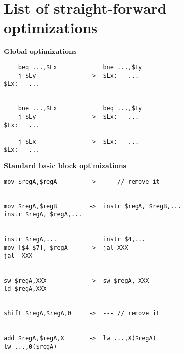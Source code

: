 \documentclass[10pt,a4paper]{article}
\begin{document}
\pagebreak
\appendix

\section{List of straight-forward optimizations}

\label{opt}

\textbf{Global optimizations}

\begin{verbatim}
    beq ...,$Lx             bne ...,$Ly
    j $Ly               ->  $Lx:   ...
$Lx:   ...


    bne ...,$Lx             beq ...,$Ly
    j $Ly               ->  $Lx:   ...
$Lx:   ...

    j $Lx               ->  $Lx:   ...
$Lx:   ...
\end{verbatim}
\textbf{Standard basic block optimizations}

\begin{verbatim}
mov $regA,$regA         ->  --- // remove it


mov $regA,$regB         ->  instr $regA, $regB,...
instr $regA, $regA,...


instr $regA,...             instr $4,...
mov [$4-$7], $regA      ->  jal XXX
jal  XXX


sw $regA,XXX            ->  sw $regA, XXX
ld $regA,XXX


shift $regA,$regA,0     ->  --- // remove it


add $regA,$regA,X       ->  lw ...,X($regA)
lw ...,0($regA)
\end{verbatim}
\end{document}
